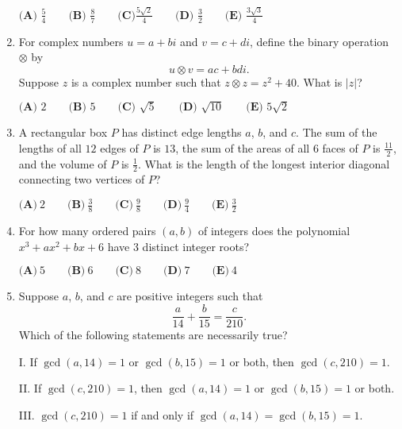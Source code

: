 \documentclass{article}
\begin{document}
\begin{enumerate}[label=\arabic*., itemsep=0.5em]
\(\textbf{(A) }\frac 54 \qquad \textbf{(B) } \frac 87 \qquad \textbf{(C)} \frac{5\sqrt2}4 \qquad \textbf{(D) } \frac 32  \qquad \textbf{(E) } \frac{3\sqrt3}4\)\par \vspace{0.5em}\item For complex numbers \(u=a+bi\) and \(v=c+di\), define the binary operation \(\otimes\) by
\begin{equation*}
u\otimes v=ac+bdi.
\end{equation*}
Suppose \(z\) is a complex number such that \(z\otimes z=z^{2}+40\). What is \(|z|\)?

\(\textbf{(A) }2\qquad\textbf{(B) }5\qquad\textbf{(C) }\sqrt{5}\qquad\textbf{(D) }\sqrt{10}\qquad\textbf{(E) }5\sqrt{2}\)\par \vspace{0.5em}\item A rectangular box \(P\) has distinct edge lengths \(a\), \(b\), and \(c\). The sum of the lengths of all \(12\) edges of \(P\) is \(13\), the sum of the areas of all \(6\) faces of \(P\) is \(\frac{11}{2}\), and the volume of \(P\) is \(\frac{1}{2}\). What is the length of the longest interior diagonal connecting two vertices of \(P\)?

\(\textbf{(A)}~2\qquad\textbf{(B)}~\frac{3}{8}\qquad\textbf{(C)}~\frac{9}{8}\qquad\textbf{(D)}~\frac{9}{4}\qquad\textbf{(E)}~\frac{3}{2}\)\par \vspace{0.5em}\item For how many ordered pairs \((a,b)\) of integers does the polynomial \(x^3+ax^2+bx+6\) have \(3\) distinct integer roots?

\(\textbf{(A)}\ 5 \qquad\textbf{(B)}\ 6 \qquad\textbf{(C)}\ 8 \qquad\textbf{(D)}\ 7 \qquad\textbf{(E)}\ 4\)\par \vspace{0.5em}\item Suppose \(a\), \(b\), and \(c\) are positive integers such that
\begin{equation*}
\frac{a}{14}+\frac{b}{15}=\frac{c}{210}.
\end{equation*}
Which of the following statements are necessarily true?

I. If \(\gcd(a,14)=1\) or \(\gcd(b,15)=1\) or both, then \(\gcd(c,210)=1\).

II. If \(\gcd(c,210)=1\), then \(\gcd(a,14)=1\) or \(\gcd(b,15)=1\) or both.

III. \(\gcd(c,210)=1\) if and only if \(\gcd(a,14)=\gcd(b,15)=1\).


\end{enumerate}
\end{document}
